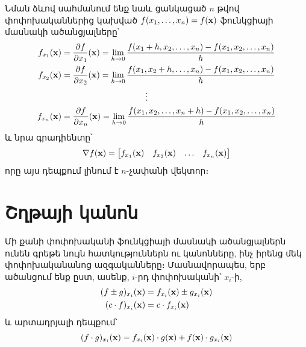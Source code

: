 Նման  ձևով սահմանում ենք նաև ցանկացած $n$ թվով փոփոխականնե\-րից կախված $f(x_1,\dots,x_n)=f(\mathbf{x})$ ֆունկցիայի մասնակի ածանցյալները՝
\begin{align*}
f_{x_1}(\mathbf{x}) &= \frac{\partial f}{\partial x_1}(\mathbf{x}) = \lim_{{h \to 0}} \frac{f(x_1 + h, x_2, \ldots, x_n) - f(x_1, x_2, \ldots, x_n)}{h}\\
f_{x_2}(\mathbf{x}) &= \frac{\partial f}{\partial x_2}(\mathbf{x}) = \lim_{{h \to 0}} \frac{f(x_1, x_2+h, \ldots, x_n) - f(x_1, x_2, \ldots, x_n)}{h} 
\\
&\qquad \qquad \qquad \qquad \qquad  \vdots  \\
f_{x_n}(\mathbf{x}) &= \frac{\partial f}{\partial x_n}(\mathbf{x}) = \lim_{{h \to 0}} \frac{f(x_1, x_2, \ldots, x_n + h) - f(x_1, x_2, \ldots, x_n)}{h}
\end{align*}
և նրա գրադիենտը՝
\[
\nabla f(\mathbf{x}) =
\begin{bmatrix}
f_{x_1}(\mathbf{x}) &
f_{x_2}(\mathbf{x}) &
\dots &
f_{x_n}(\mathbf{x})
\end{bmatrix}
\]
որը այս դեպքում լինում է $n$-չափանի վեկտոր։


\section{Շղթայի կանոն}

Մի քանի փոփոխականի ֆունկցիայի մասնակի ածանցյալներն ունեն գրեթե նույն հատկություններն ու կանոնները, ինչ իրենց մեկ փոփոխա\-կա\-նանոց ազգականները։ Մասնավորապես, երբ ածանցում ենք ըստ, ասենք, $i$-րդ փոփոխականի՝ $x_i$-ի,
\begin{align*}
(f \pm g)_{x_i}(\mathbf{x}) &= f_{x_i}(\mathbf{x}) \pm g_{x_i}(\mathbf{x})\\
(c \cdot f)_{x_i}(\mathbf{x}) &= c \cdot f_{x_i}(\mathbf{x})
\end{align*}
և արտադրյալի դեպքում՝
\[
(f \cdot g)_{x_i}(\mathbf{x}) = f_{x_i}(\mathbf{x})  \cdot  g(\mathbf{x}) + f(\mathbf{x}) \cdot g_{x_i}(\mathbf{x})
\]

        


